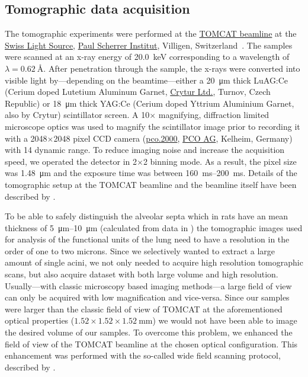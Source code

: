 \documentclass[%
	paper=a4,%
	abstract=true,%
	]{scrartcl}
\begin{document}
\subsection{Tomographic data acquisition}
The tomographic experiments were performed at the \href{http://www.psi.ch/sls/tomcat/}{TOMCAT beamline} at the \href{http://www.psi.ch/sls/}{Swiss Light Source}, \href{http://www.psi.ch/}{Paul Scherrer Institut}, Villigen, Switzerland~\cite{Stampanoni2006a}. The samples were scanned at an x-ray energy of \SI{20.0}{\kilo\electronvolt} corresponding to a wavelength of \(\lambda=\SI{0.62}{\angstrom}\). %
After penetration through the sample, the x-rays were converted into visible light by---depending on the beamtime---either a \SI{20}{\micro\meter} thick LuAG:Ce (Cerium doped Lutetium Aluminum Garnet, \href{http://www.crytur.cz/}{Crytur Ltd.}, Turnov, Czech Republic) or \SI{18}{\micro\meter} thick YAG:Ce (Cerium doped Yttrium Aluminium Garnet, also by Crytur) scintillator screen. A 10\(\times\) magnifying, diffraction limited microscope optics was used to magnify the scintillator image prior to recording it with a 2048\(\times\)2048 pixel CCD camera (\href{http://www.pco.de/sensitive-cameras/pco2000/}{pco.2000}, \href{http://www.pco.de/}{PCO AG}, Kelheim, Germany) with \SI{14}{\bit} dynamic range. To reduce imaging noise and increase the acquisition speed, we operated the detector in 2\(\times\)2 binning mode. As a result, the pixel size was \SI{1.48}{\micro\meter} and the exposure time was between \SIrange{160}{200}{\milli\second}. Details of the tomographic setup at the TOMCAT beamline and the beamline itself have been described by \citet{Stampanoni2006a}.

To be able to safely distinguish the alveolar septa which in rats have an mean thickness of \SIrange{5}{10}{\micro\meter} (calculated from data in \citet{Burri1974}) the tomographic images used for analysis of the functional units of the lung need to have a resolution in the order of one to two microns. Since we selectively wanted to extract a large amount of single acini, we not only needed to acquire high resolution tomographic scans, but also acquire dataset with both large volume and high resolution. Usually---with classic microscopy based imaging methods---a large field of view can only be acquired with low magnification and vice-versa. Since our samples were larger than the classic field of view of TOMCAT at the aforementioned optical properties (\(1.52\times1.52\times\SI{1.52}{\milli\meter}\)) we would not have been able to image the desired volume of our samples. To overcome this problem, we enhanced the field of view of the TOMCAT beamline at the chosen optical configuration. This enhancement was performed with the so-called wide field scanning protocol, described by \citet{Haberthuer2010a}.
\end{document}
